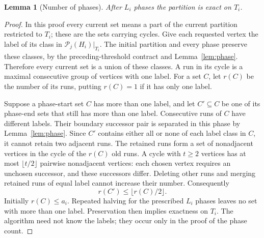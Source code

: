 \documentclass[11pt]{article}
\newtheorem{lemma}[theorem]{Lemma}
\theoremstyle{definition}
\theoremstyle{remark}
\newcommand{\PP}{\mathcal P}
\begin{document}
\begin{lemma}[Number of phases]
\label{lem:phases}
After \(L_i\) phases the partition is exact on \(T_i\).
\end{lemma}
\begin{proof}
In this proof every current set means a part of the current partition restricted to \(T_i\); these are the sets carrying cycles. Give each requested vertex the label of its class in \(\PP_j(H_i)|_{T_i}\). The initial partition and every phase preserve these classes, by the preceding-threshold contract and Lemma~\ref{lem:phase}. Therefore every current set is a union of these classes. A run in its cycle is a maximal consecutive group of vertices with one label. For a set \(C\), let \(r(C)\) be the number of its runs, putting \(r(C)=1\) if it has only one label.

Suppose a phase-start set \(C\) has more than one label, and let \(C'\subseteq C\) be one of its phase-end sets that still has more than one label. Consecutive runs of \(C\) have different labels. Their boundary successor pair is separated in this phase by Lemma~\ref{lem:phase}. Since \(C'\) contains either all or none of each label class in \(C\), it cannot retain two adjacent runs. The retained runs form a set of nonadjacent vertices in the cycle of the \(r(C)\) old runs. A cycle with \(t\ge2\) vertices has at most \(\lfloor t/2\rfloor\) pairwise nonadjacent vertices: each chosen vertex requires an unchosen successor, and these successors differ. Deleting other runs and merging retained runs of equal label cannot increase their number. Consequently
\begin{equation}
 r(C')\le\lfloor r(C)/2\rfloor.
 \label{eq:run-halving}
\end{equation}
Initially \(r(C)\le a_i\). Repeated halving for the prescribed \(L_i\) phases leaves no set with more than one label. Preservation then implies exactness on \(T_i\). The algorithm need not know the labels; they occur only in the proof of the phase count.
\end{proof}
\end{document}
